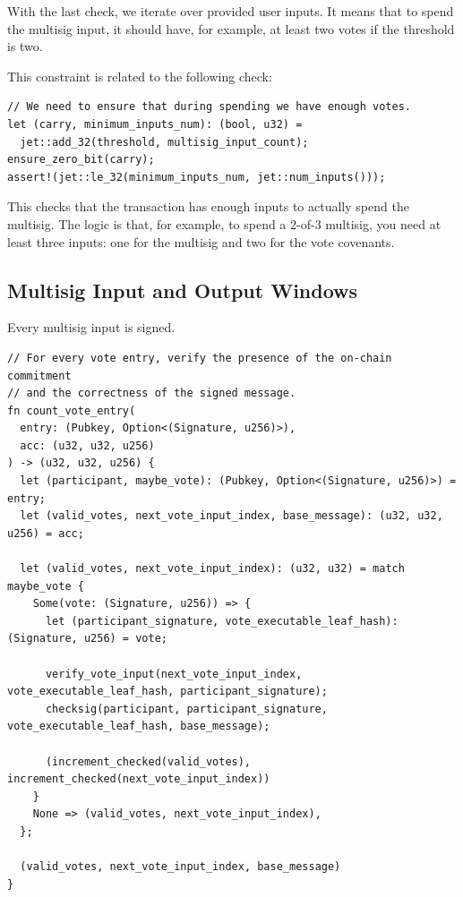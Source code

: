 \documentclass[11pt]{article}
\begin{document}
    With the last check, we iterate over provided user inputs. It means that to spend the multisig input, it should have, for example, at least two votes if the threshold is two.

    This constraint is related to the following check:

    \begin{lstlisting}
// We need to ensure that during spending we have enough votes.
let (carry, minimum_inputs_num): (bool, u32) =
  jet::add_32(threshold, multisig_input_count);
ensure_zero_bit(carry);
assert!(jet::le_32(minimum_inputs_num, jet::num_inputs()));
    \end{lstlisting}

    This checks that the transaction has enough inputs to actually spend the multisig. The logic is that, for example, to spend a 2-of-3 multisig, you need at least three inputs: one for the multisig and two for the vote covenants.

    \subsection{Multisig Input and Output Windows}

    Every multisig input is signed.

    \begin{lstlisting}
// For every vote entry, verify the presence of the on-chain commitment
// and the correctness of the signed message.
fn count_vote_entry(
  entry: (Pubkey, Option<(Signature, u256)>),
  acc: (u32, u32, u256)
) -> (u32, u32, u256) {
  let (participant, maybe_vote): (Pubkey, Option<(Signature, u256)>) = entry;
  let (valid_votes, next_vote_input_index, base_message): (u32, u32, u256) = acc;

  let (valid_votes, next_vote_input_index): (u32, u32) = match maybe_vote {
    Some(vote: (Signature, u256)) => {
      let (participant_signature, vote_executable_leaf_hash): (Signature, u256) = vote;

      verify_vote_input(next_vote_input_index, vote_executable_leaf_hash, participant_signature);
      checksig(participant, participant_signature, vote_executable_leaf_hash, base_message);

      (increment_checked(valid_votes), increment_checked(next_vote_input_index))
    }
    None => (valid_votes, next_vote_input_index),
  };

  (valid_votes, next_vote_input_index, base_message)
}
    \end{lstlisting}
\end{document}
